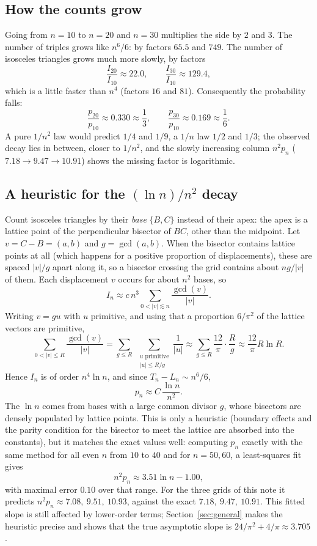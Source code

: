 \documentclass[11pt,a4paper]{article}
\theoremstyle{remark}
\begin{document}
\subsection{How the counts grow}

Going from $n=10$ to $n=20$ and $n=30$ multiplies the side by $2$ and $3$. The
number of triples grows like $n^6/6$: by factors $65.5$ and $749$. The number of
isosceles triangles grows much more slowly, by factors
\[
  \frac{I_{20}}{I_{10}}\approx22.0,\qquad\frac{I_{30}}{I_{10}}\approx129.4,
\]
which is a little faster than $n^4$ (factors $16$ and $81$). Consequently the
probability falls:
\[
  \frac{p_{20}}{p_{10}}\approx0.330\approx\frac13,
  \qquad
  \frac{p_{30}}{p_{10}}\approx0.169\approx\frac16 .
\]
A pure $1/n^2$ law would predict $1/4$ and $1/9$, a $1/n$ law $1/2$ and $1/3$; the
observed decay lies in between, closer to $1/n^2$, and the slowly increasing
column $n^2p_n$ ($7.18\to9.47\to10.91$) shows the missing factor is logarithmic.

\subsection{A heuristic for the $(\ln n)/n^2$ decay}

Count isosceles triangles by their \emph{base} $\{B,C\}$ instead of their apex: the
apex is a lattice point of the perpendicular bisector of $BC$, other than the
midpoint. Let $v=C-B=(a,b)$ and $g=\gcd(a,b)$. When the bisector contains lattice
points at all (which happens for a positive proportion of displacements), these
are spaced $|v|/g$ apart along it, so a bisector crossing the grid contains about
$n g/|v|$ of them. Each displacement $v$ occurs for about $n^2$ bases, so
\[
  I_n\approx c\,n^3\sum_{0<|v|\lesssim n}\frac{\gcd(v)}{|v|}.
\]
Writing $v=g u$ with $u$ primitive, and using that a proportion $6/\pi^2$ of the
lattice vectors are primitive,
\[
  \sum_{0<|v|\le R}\frac{\gcd(v)}{|v|}
  =\sum_{g\le R}\;\sum_{\substack{u\text{ primitive}\\|u|\le R/g}}\frac1{|u|}
  \approx\sum_{g\le R}\frac{12}{\pi}\cdot\frac Rg
  \approx\frac{12}{\pi}R\ln R .
\]
Hence $I_n$ is of order $n^4\ln n$, and since $T_n-L_n\sim n^6/6$,
\[
  p_n\approx C\,\frac{\ln n}{n^2}.
\]
The $\ln n$ comes from bases with a large common divisor $g$, whose bisectors are
densely populated by lattice points. This is only a heuristic (boundary effects
and the parity condition for the bisector to meet the lattice are absorbed into
the constants), but it matches the exact values well: computing $p_n$ exactly
with the same method for all even $n$ from $10$ to $40$ and for $n=50,60$, a
least-squares fit gives
\[
  n^2p_n\approx3.51\ln n-1.00,
\]
with maximal error $0.10$ over that range. For the three grids of this note
it predicts $n^2p_n\approx7.08,\ 9.51,\ 10.93$, against the exact
$7.18,\ 9.47,\ 10.91$. This fitted slope is still affected by lower-order terms;
Section~\ref{sec:general} makes the heuristic precise and shows that the true
asymptotic slope is $24/\pi^2+4/\pi\approx3.705$.
\end{document}
